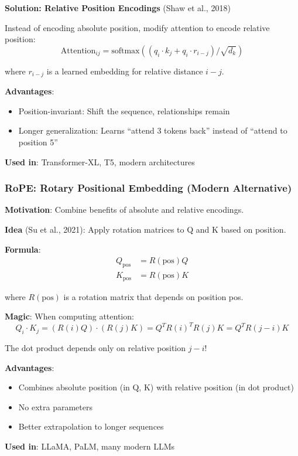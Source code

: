 \documentclass[11pt,oneside]{book}
\begin{document}
\textbf{Solution: Relative Position Encodings} (Shaw et al., 2018)

Instead of encoding absolute position, modify attention to encode relative position:
\[
\text{Attention}_{ij} = \text{softmax}((q_i \cdot k_j + q_i \cdot r_{i-j}) / \sqrt{d_k})
\]

where $r_{i-j}$ is a learned embedding for relative distance $i-j$.

\textbf{Advantages}:
\begin{itemize}
\item Position-invariant: Shift the sequence, relationships remain
\item Longer generalization: Learns ``attend 3 tokens back'' instead of ``attend to position 5''
\end{itemize}

\textbf{Used in}: Transformer-XL, T5, modern architectures

\subsubsection{RoPE: Rotary Positional Embedding (Modern Alternative)}

\textbf{Motivation}: Combine benefits of absolute and relative encodings.

\textbf{Idea} (Su et al., 2021): Apply rotation matrices to Q and K based on position.

\textbf{Formula}:
\begin{align*}
Q_{\text{pos}} &= R(\text{pos}) Q \\
K_{\text{pos}} &= R(\text{pos}) K
\end{align*}

where $R(\text{pos})$ is a rotation matrix that depends on position pos.

\textbf{Magic}: When computing attention:
\[
Q_i \cdot K_j = (R(i)Q) \cdot (R(j)K) = Q^T R(i)^T R(j) K = Q^T R(j-i) K
\]

The dot product depends only on relative position $j-i$!

\textbf{Advantages}:
\begin{itemize}
\item Combines absolute position (in Q, K) with relative position (in dot product)
\item No extra parameters
\item Better extrapolation to longer sequences
\end{itemize}

\textbf{Used in}: LLaMA, PaLM, many modern LLMs
\end{document}

